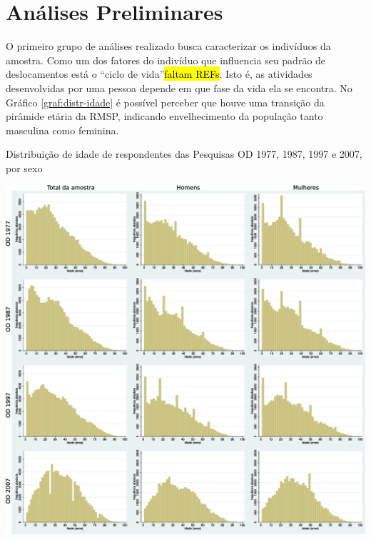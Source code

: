 \clearpage
\section{Análises Preliminares}\label{sec:analises-preliminares}

O primeiro grupo de análises realizado busca caracterizar os indivíduos da amostra. Como um dos fatores do indivíduo que influencia seu padrão de deslocamentos está o ``ciclo de vida''\hl{faltam REFs}. Isto é, as atividades desenvolvidas por uma pessoa depende em que fase da vida ela se encontra. No Gráfico \ref{graf:distr-idade} é possível perceber que houve uma transição da pirâmide etária da RMSP, indicando envelhecimento da população tanto masculina como feminina.

\begin{grafico}[htb]%
    \caption{\label{graf:distr-idade}Distribuição de idade de respondentes das Pesquisas OD 1977, 1987, 1997 e 2007, por sexo}%
    \begin{center}%
        \includegraphics[width=1\textwidth]{./imagens/idade2.eps}%
    \end{center}%
\end{grafico}%

